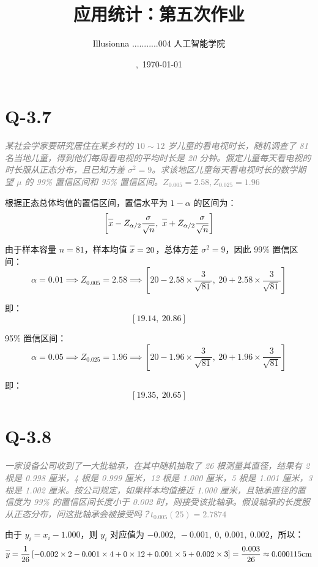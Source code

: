 \documentclass{article}
\title{\vspace{-3em}应用统计：第五次作业}
\author{Illusionna \quad 2025...........004 \quad 人工智能学院}
\date{\currenttime,\ \today}
\newcommand{\barline}[1]{\overline{#1\rule{0pt}{1.5ex}}}
\begin{document}
\maketitle\vspace*{-1.5em}



\section{Q-3.7}
\textit{\textcolor{gray}{某社会学家要研究居住在某乡村的 $10\sim12$ 岁儿童的看电视时长，随机调查了 81 名当地儿童，得到他们每周看电视的平均时长是 20 分钟。假定儿童每天看电视的时长服从正态分布，且已知方差 $\sigma^2=9$。求该地区儿童每天看电视时长的数学期望 $\mu$ 的 99\% 置信区间和 95\% 置信区间。$Z_{0.005} = 2.58, Z_{0.025} = 1.96$}}

根据正态总体均值的置信区间，置信水平为 $1-\alpha$ 的区间为：
\[ \left[\barline{x}-Z_{\alpha/2}\dfrac{\sigma}{\displaystyle\sqrt{n}},\ \barline{x}+Z_{\alpha/2}\dfrac{\sigma}{\displaystyle\sqrt{n}}\right] \]

由于样本容量 $n=81$，样本均值 $\barline{x}=20$，总体方差 $\sigma^2=9$，因此 99\% 置信区间：
\[ \alpha=0.01\implies Z_{0.005}=2.58\implies\left[20-2.58\times\dfrac{3}{\displaystyle\sqrt{81}},\ 20+2.58\times\dfrac{3}{\displaystyle\sqrt{81}}\right] \]

即：
\[ [19.14,\ 20.86] \]

95\% 置信区间：
\[ \alpha=0.05\implies Z_{0.025}=1.96\implies\left[20-1.96\times\dfrac{3}{\displaystyle\sqrt{81}},\ 20+1.96\times\dfrac{3}{\displaystyle\sqrt{81}}\right] \]

即：
\[ [19.35,\ 20.65] \]



\section{Q-3.8}
\textit{\textcolor{gray}{一家设备公司收到了一大批轴承，在其中随机抽取了 26 根测量其直径，结果有 2 根是 0.998 厘米，4 根是 0.999 厘米，12 根是 1.000 厘米，5 根是 1.001 厘米，3 根是 1.002 厘米。按公司规定，如果样本均值接近 1.000 厘米，且轴承直径的置信度为 99\% 的置信区间长度小于 0.002 时，则接受该批轴承。假设轴承的长度服从正态分布，问这批轴承会被接受吗？$t_{0.005}(25) = 2.7874$}}

由于 $y_i=x_i-1.000$，则 $y_i$ 对应值为 $-0.002,\ -0.001,\ 0,\ 0.001,\ 0.002$，所以：
\[ \barline{y}=\dfrac{1}{26}\left[-0.002\times2-0.001\times4+0\times12+0.001\times5+0.002\times3\right]=\dfrac{0.003}{26}\approx0.000115\text{cm} \]
\end{document}
